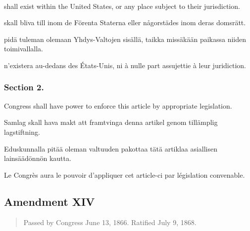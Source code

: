 \documentclass[a4,landscape,12pt]{article}
\begin{document}
~

\begin{minipage}[t]{0.22\textwidth}
shall exist within the United States, or any place subject to their jurisdiction.	
\end{minipage}\textwidth
\begin{minipage}[t]{0.22\textwidth}
skall bliva till inom de Förenta Staterna eller någorstädes inom deras domsrätt.	
\end{minipage}\textwidth
\begin{minipage}[t]{0.22\textwidth}
pidä tuleman olemaan Yhdys-Valtojen sisällä, taikka missäkään paikassa niiden toimivallalla.
\end{minipage}\textwidth
\begin{minipage}[t]{0.22\textwidth}
n'existera au-dedans des États-Unis, ni à nulle part assujettie à leur juridiction.
\end{minipage}

\subsubsection*{Section 2.}
\begin{minipage}[t]{0.22\textwidth}
Congress shall have power to enforce this article by appropriate legislation.
\end{minipage}\textwidth
\begin{minipage}[t]{0.22\textwidth}
Samlag skall hava makt att framtvinga denna artikel genom tillämplig lagstiftning.
\end{minipage}\textwidth
\begin{minipage}[t]{0.22\textwidth}
Eduskunnalla pitää oleman valtuuden pakottaa tätä artiklaa asiallisen lainsäädönnön kautta.
\end{minipage}\textwidth
\begin{minipage}[t]{0.22\textwidth}
Le Congrès aura le pouvoir d'appliquer cet article-ci par législation convenable.
\end{minipage}



\subsection*{Amendment XIV}
\begin{quote}\small
	Passed by Congress June 13, 1866. Ratified July 9, 1868.
\end{quote}
\end{document}

